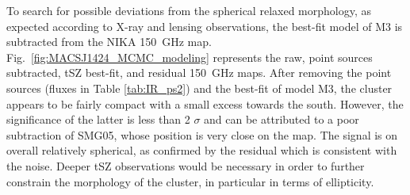 \documentclass[twocolumn,traditabstract]{aa}
\begin{document}
To search for possible deviations from the spherical relaxed morphology, as expected according to X-ray and lensing observations, the best-fit model of M3 is subtracted from the NIKA 150~GHz map. Fig.~\ref{fig:MACSJ1424_MCMC_modeling} represents the raw, point sources subtracted, tSZ best-fit, and residual 150~GHz maps. After removing the point sources (fluxes in Table \ref{tab:IR_ps2}) and the best-fit of model M3, the cluster appears to be fairly compact with a small excess towards the south. However, the significance of the latter is less than 2 $\sigma$ and can be attributed to a poor subtraction of SMG05, whose position is very close on the map. The signal is on overall relatively spherical, as confirmed by the residual which is consistent with the noise. Deeper tSZ observations would be necessary in order to further constrain the morphology of the cluster, in particular in terms of ellipticity.
\end{document}
